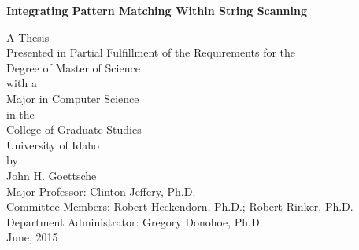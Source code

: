 \documentclass{article}
\begin{document}
\begin{titlepage}
\begin{center}
	\begin{Large}
	\textbf{Integrating Pattern Matching Within String Scanning}\\
	\end{Large}
	\begin{large}
	\vspace{5 pc}
	A Thesis\\
	Presented in Partial Fulfillment of the Requirements for the\\
	Degree of Master of Science\\
	with a\\
	Major in Computer Science\\
	in the\\
	College of Graduate Studies\\
	University of Idaho\\
	by\\John H. Goettsche\\
	\vspace{5 pc}
	Major Professor: Clinton Jeffery, Ph.D.\\
	Committee Members: Robert Heckendorn, Ph.D.; Robert Rinker, 	Ph.D.\\
	Department Administrator: Gregory Donohoe, Ph.D.\\
	\vspace{10 pc}
	June, 2015
	\end{large}
	\end{center}
\end{titlepage}

	
\thispagestyle{empty}
\end{document}
